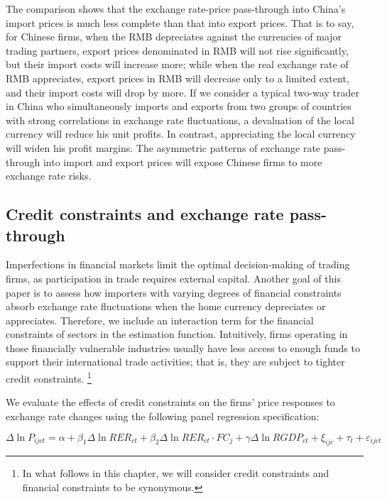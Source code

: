 The comparison shows that the exchange rate-price pass-through into China's import prices is much less complete than that into export prices. That is to say, for Chinese firms, when the RMB depreciates against the currencies of major trading partners, export prices denominated in RMB will not rise significantly, but their import costs will increase more; while when the real exchange rate of RMB appreciates, export prices in RMB will decrease only to a limited extent, and their import costs will drop by more. If we consider a typical two-way trader in China who simultaneously imports and exports from two groups of countries with strong correlations in exchange rate fluctuations, a devaluation of the local currency will reduce his unit profits. In contrast, appreciating the local currency will widen his profit margins. The asymmetric patterns of exchange rate pass-through into import and export prices will expose Chinese firms to more exchange rate risks.

\subsection{Credit constraints and exchange rate pass-through} \label{Empirical-Credit}

Imperfections in financial markets limit the optimal decision-making of trading firms, as participation in trade requires external capital. Another goal of this paper is to assess how importers with varying degrees of financial constraints absorb exchange rate fluctuations when the home currency depreciates or appreciates. Therefore, we include an interaction term for the financial constraints of sectors in the estimation function. Intuitively, firms operating in those financially vulnerable industries usually have less access to enough funds to support their international trade activities; that is, they are subject to tighter credit constraints. \footnote{In what follows in this chapter, we will consider credit constraints and financial constraints to be synonymous.}

We evaluate the effects of credit constraints on the firms' price responses to exchange rate changes using the following panel regression specification:

\begin{equation}
	\Delta \ln P_{ijct}=\alpha+\beta_{1} \Delta \ln RER_{ct}+\beta_{2} \Delta \ln RER_{ct} \cdot FC_{j}+\gamma \Delta \ln RGDP_{ct}+\xi_{ijc}+\tau_{t} +\varepsilon_{ijct}
	\label{eq.credit}
\end{equation}

